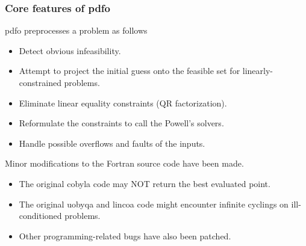 \documentclass[usenames,dvipsnames,10pt]{beamer}
\begin{document}
\begin{frame}
    \frametitle{Core features of \gls{pdfo}}

    \begin{exampleblock}{\gls{pdfo} preprocesses a problem as follows}
        \addtolength{\leftmargini}{\dimexpr\medskipamount+.2ex\relax}
        \begin{itemize}
            \item Detect obvious \alert{infeasibility}.
            \item Attempt to \alert{project the initial guess} onto the feasible set for linearly-constrained problems.
            \item Eliminate \alert{linear equality constraints} (QR factorization).
            \item \alert{Reformulate the constraints} to call the Powell's solvers.
            \item Handle possible \alert{overflows} and \alert{faults} of the inputs.
        \end{itemize}
    \end{exampleblock}

    Minor modifications to the Fortran source code have been made.
    \begin{itemize}
        \item The original \gls{cobyla} code may \alert{NOT return} the best evaluated point.
        \item The original \gls{uobyqa} and \gls{lincoa} code might encounter \alert{infinite cyclings} on \textcolor{BrickRed}{ill-conditioned problems}.
        \item Other programming-related bugs have also been patched.
    \end{itemize}
\end{frame}
\end{document}

